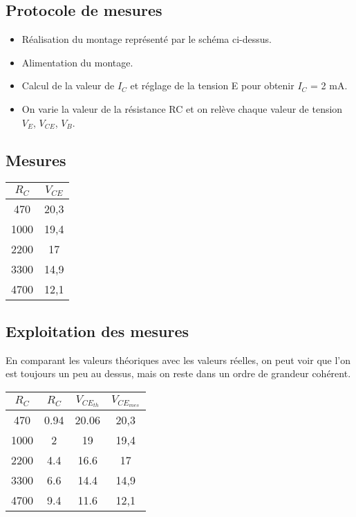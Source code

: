 \documentclass{article}
\begin{document}
\subsection{Protocole de mesures}
\begin{itemize}
    \item Réalisation du montage représenté par le schéma ci-dessus.
    \item Alimentation du montage.
    \item Calcul de la valeur de $I_C$ et réglage de la tension E pour obtenir $I_C$ = 2 mA.
    \item On varie la valeur de la résistance RC et on relève chaque valeur de tension $V_E$, $V_{CE}$, $V_B$.
\end{itemize}

\subsection{Mesures}

\begin{center}
    \begin{tabular}{||c | c||}
    \hline
    $R_C$ & $V_{CE}$\\
    \hline
    \hline
    470  & 20,3\\
    \hline
    1000  & 19,4\\
    \hline
    2200  & 17\\
    \hline
    3300  & 14,9\\
    \hline
    4700  & 12,1\\
    \hline
    \end{tabular}
\end{center}

\subsection{Exploitation des mesures}
En comparant les valeurs théoriques avec les valeurs réelles, on peut voir que l’on est toujours un peu au dessus, mais on reste dans un ordre de grandeur cohérent.

\begin{center}
    \begin{tabular}{||c | c | c || c||}
    \hline
    $R_C$ & $R_C$ & $V_{CE_{th}}$ & $V_{CE_{mes}}$\\
    \hline
    \hline
    470 & 0.94 & 20.06 & 20,3\\
    \hline
    1000 & 2 & 19 & 19,4\\
    \hline
    2200 & 4.4 & 16.6 & 17\\
    \hline
    3300 & 6.6 & 14.4 & 14,9\\
    \hline
    4700 & 9.4 & 11.6 & 12,1\\
    \hline
    \end{tabular}
\end{center}
\end{document}
